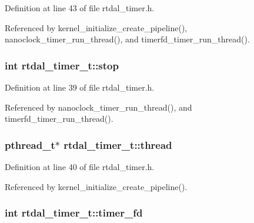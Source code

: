 Definition at line 43 of file rtdal\-\_\-timer.\-h.



Referenced by kernel\-\_\-initialize\-\_\-create\-\_\-pipeline(), nanoclock\-\_\-timer\-\_\-run\-\_\-thread(), and timerfd\-\_\-timer\-\_\-run\-\_\-thread().

\hypertarget{structrtdal__timer__t_a760c332c00e1eebe04e98f6b238932b5}{
\subsubsection[{stop}]{\setlength{\rightskip}{0pt plus 5cm}int rtdal\-\_\-timer\-\_\-t\-::stop}}\label{structrtdal__timer__t_a760c332c00e1eebe04e98f6b238932b5}


Definition at line 39 of file rtdal\-\_\-timer.\-h.



Referenced by nanoclock\-\_\-timer\-\_\-run\-\_\-thread(), and timerfd\-\_\-timer\-\_\-run\-\_\-thread().

\hypertarget{structrtdal__timer__t_a935b3c9da18c2f0a39588f4bba9e13d6}{
\subsubsection[{thread}]{\setlength{\rightskip}{0pt plus 5cm}pthread\-\_\-t$\ast$ rtdal\-\_\-timer\-\_\-t\-::thread}}\label{structrtdal__timer__t_a935b3c9da18c2f0a39588f4bba9e13d6}


Definition at line 40 of file rtdal\-\_\-timer.\-h.



Referenced by kernel\-\_\-initialize\-\_\-create\-\_\-pipeline().

\hypertarget{structrtdal__timer__t_aa7bf664cf9401e16c226f326e0672dfd}{
\subsubsection[{timer\-\_\-fd}]{\setlength{\rightskip}{0pt plus 5cm}int rtdal\-\_\-timer\-\_\-t\-::timer\-\_\-fd}}\label{structrtdal__timer__t_aa7bf664cf9401e16c226f326e0672dfd}


